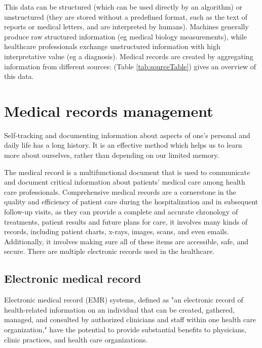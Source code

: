 \newpage

This data can be structured (which can be used directly by an algorithm) or unstructured (they are stored without a predefined format, such as the text of reports or medical letters, and are interpreted by humans). Machines generally produce raw structured information (eg medical biology measurements), while healthcare professionals exchange unstructured information with high interpretative value (eg a diagnosis). 
Medical records are created by aggregating information from different sources: (Table \ref{tab:sourceTable}) gives an overview of this data\cite{martigneneVisualisationUnifieeDonnees}. 




\section{Medical records management}
Self-tracking and documenting information about aspects of one’s personal and daily life has a long history. It is an effective method which helps us to learn more about ourselves, rather than depending on our limited memory\cite{alrehielyEvaluatingDifferentVisualization}.


The medical record is a multifunctional document that is used to communicate and document critical information about patients’ medical care among health care professionals. Comprehensive medical records are a cornerstone in the quality and efficiency of patient care during the hospitalization and in subsequent follow-up visits, as they can provide a complete and accurate chronology of treatments, patient results and future plans for care\cite{wong2009developing}, it involves many kinds of records, including patient charts, x-rays, images, scans, and even emails. Additionally, it involves making sure all of these items are accessible, safe, and secure.
There are multiple electronic records used in the healthcare.
\subsection{Electronic medical record}
Electronic medical record (EMR) systems, defined as "an electronic record of health-related information on an individual that can be created, gathered, managed, and consulted by authorized clinicians and staff within one health care organization,"  have the potential to provide substantial benefits to physicians, clinic practices, and health care organizations. 

